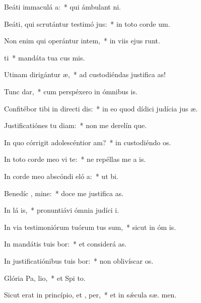 \item Beáti immaculá  a:~* qui ámbulant   ni.
\item Beáti, qui scrutántur testimó jus:~* in toto corde  um.
\item Non enim qui operántur intem,~* in viis ejus runt.
\item {} ti~* mandáta tua cus mis.
\item Utinam dirigántur  æ,~* ad custodiéndas justifica as!
\item Tunc  dar,~* cum perspéxero in ómnibus  is.
\item Confitébor tibi in directi dis:~* in eo quod dídici judícia jus æ.
\item Justificatiónes tu diam:~* non me derelín que.
\item In quo córrigit adolescéntior  am?~* in custodiéndo  os.
\item In toto corde meo vi te:~* ne repéllas me a  is.
\item In corde meo abscóndi eló a:~* ut   bi.
\item Benedíc , mine:~* doce me justifica as.
\item In lá is,~* pronuntiávi ómnia judíci  i.
\item In via testimoniórum tuórum tus sum,~* sicut in óm is.
\item In mandátis tuis bor:~* et considerá  as.
\item In justificatiónibus tuis bor:~* non oblivíscar  os.
\item Glória Pa,  lio,~* et Spi to.
\item Sicut erat in princípio, et ,  per,~* et in sǽcula sæ. men.
